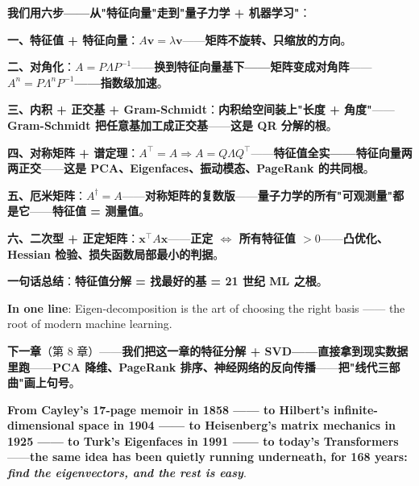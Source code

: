 \begin{tcolorbox}[essbox={本章小结}]
\textbf{我们用六步——从"特征向量"走到"量子力学 + 机器学习"}：

\medskip

\textbf{一、特征值 + 特征向量}：\textbf{$A\bm{v}=\lambda\bm{v}$}——\textbf{矩阵不旋转、只缩放的方向}。

\medskip

\textbf{二、对角化}：\textbf{$A=P\Lambda P^{-1}$}——\textbf{换到特征向量基下——矩阵变成对角阵}——\textbf{$A^n = P\Lambda^n P^{-1}$——指数级加速}。

\medskip

\textbf{三、内积 + 正交基 + Gram-Schmidt}：\textbf{内积给空间装上"长度 + 角度"}——\textbf{Gram-Schmidt 把任意基加工成正交基}——\textbf{这是 QR 分解的根}。

\medskip

\textbf{四、对称矩阵 + 谱定理}：\textbf{$A^\top = A \Rightarrow A=Q\Lambda Q^\top$}——\textbf{特征值全实——特征向量两两正交}——\textbf{这是 PCA、Eigenfaces、振动模态、PageRank 的共同根}。

\medskip

\textbf{五、厄米矩阵}：\textbf{$A^\dagger = A$}——\textbf{对称矩阵的复数版}——\textbf{量子力学的所有"可观测量"都是它}——\textbf{特征值 = 测量值}。

\medskip

\textbf{六、二次型 + 正定矩阵}：\textbf{$\bm{x}^\top A \bm{x}$}——\textbf{正定 $\iff$ 所有特征值 $>0$}——\textbf{凸优化、Hessian 检验、损失函数局部最小的判据}。

\medskip

\textbf{一句话总结}：\textbf{特征值分解 = 找最好的基 = 21 世纪 ML 之根}。

\medskip

\textbf{In one line}: Eigen-decomposition is the art of choosing the right basis —— the root of modern machine learning.
\end{tcolorbox}

\textbf{下一章}（第 8 章）——\textbf{我们把这一章的特征分解 + SVD——直接拿到现实数据里跑}——\textbf{PCA 降维、PageRank 排序、神经网络的反向传播}——\textbf{把"线代三部曲"画上句号}。

\textbf{From Cayley's 17-page memoir in 1858 —— to Hilbert's infinite-dimensional space in 1904 —— to Heisenberg's matrix mechanics in 1925 —— to Turk's Eigenfaces in 1991 —— to today's Transformers}——\textbf{the same idea has been quietly running underneath, for 168 years: \emph{find the eigenvectors, and the rest is easy}}.

\clearpage
